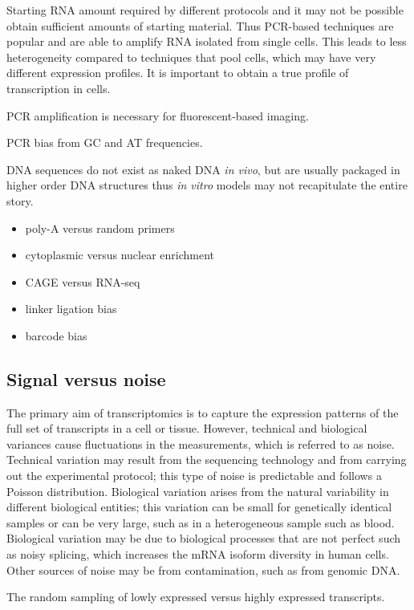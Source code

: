Starting RNA amount required by different protocols and it may not be possible obtain sufficient amounts of starting material. Thus PCR-based techniques are popular and are able to amplify RNA isolated from single cells. This leads to less heterogeneity compared to techniques that pool cells, which may have very different expression profiles. It is important to obtain a true profile of transcription in cells.

PCR amplification is necessary for fluorescent-based imaging.

PCR bias from GC and AT frequencies.

DNA sequences do not exist as naked DNA \textit{in vivo}, but are usually packaged in higher order DNA structures thus \textit{in vitro} models may not recapitulate the entire story.

\begin{itemize}
   \item poly-A versus random primers
   \item cytoplasmic versus nuclear enrichment
   \item CAGE versus RNA-seq
   \item linker ligation bias
   \item barcode bias
\end{itemize}

\subsection{Signal versus noise}

The primary aim of transcriptomics is to capture the expression patterns of the full set of transcripts in a cell or tissue. However, technical and biological variances cause fluctuations in the measurements, which is referred to as noise. Technical variation may result from the sequencing technology and from carrying out the experimental protocol; this type of noise is predictable and follows a Poisson distribution. Biological variation arises from the natural variability in different biological entities; this variation can be small for genetically identical samples or can be very large, such as in a heterogeneous sample such as blood. Biological variation may be due to biological processes that are not perfect such as noisy splicing, which increases the mRNA isoform diversity in human cells\cite{pmid21151575}. Other sources of noise may be from contamination, such as from genomic DNA.

The random sampling of lowly expressed versus highly expressed transcripts.

